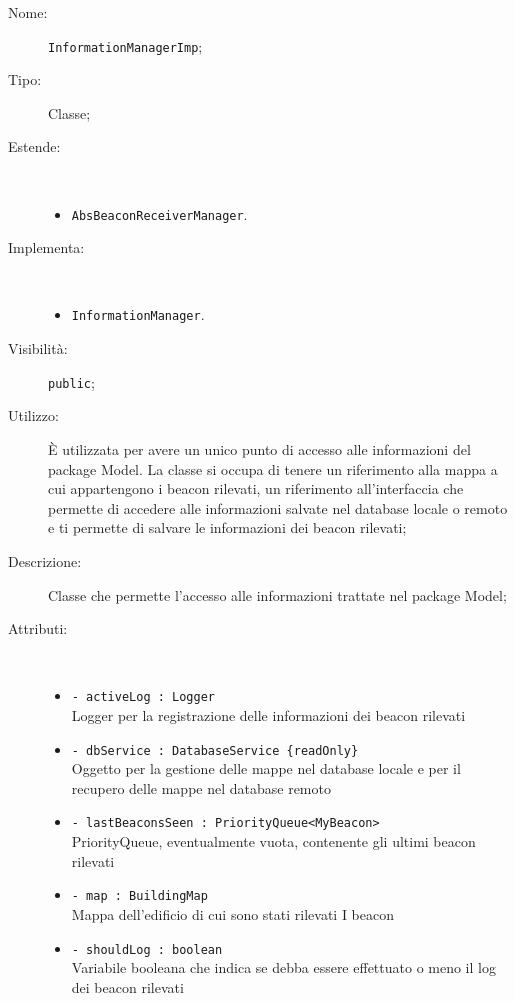 \documentclass[../DefinizioneDiProdotto.tex]{subfiles}
\begin{document}
\begin{description}
	\item[Nome:] \texttt{InformationManagerImp};
	\item[Tipo:] Classe;
	\item[Estende:] \
	\begin{itemize}
		\item \texttt{AbsBeaconReceiverManager}.
	\end{itemize}
	\item[Implementa:] \
	\begin{itemize}
		\item \texttt{InformationManager}.
		
	\end{itemize}
	\item[Visibilità:] \texttt{public};
	\item[Utilizzo:] È utilizzata per avere un unico punto di accesso alle informazioni del package Model. La classe si occupa di tenere un riferimento alla mappa a cui appartengono i beacon rilevati, un riferimento all'interfaccia che permette di accedere alle informazioni salvate nel database locale o remoto e ti permette di salvare le informazioni dei beacon rilevati;
	\item[Descrizione:] Classe che permette l'accesso alle informazioni trattate nel package Model;
	\item[Attributi:] \
	\begin{itemize}
		\item \texttt{- activeLog : Logger}\\
		Logger per la registrazione delle informazioni dei beacon rilevati
		
		\item \texttt{- dbService : DatabaseService \{readOnly\}}\\
		Oggetto per la gestione delle mappe nel database locale e per il recupero delle mappe nel database remoto
		
		\item \texttt{- lastBeaconsSeen : PriorityQueue<MyBeacon>}\\
		PriorityQueue, eventualmente vuota, contenente gli ultimi beacon rilevati
		
		\item \texttt{- map : BuildingMap}\\
		Mappa dell'edificio di cui sono stati rilevati I beacon
		
		\item \texttt{- shouldLog : boolean}\\
		Variabile booleana che indica se debba essere effettuato o meno il log dei beacon rilevati
		

\end{itemize}
\end{description}
\end{document}
